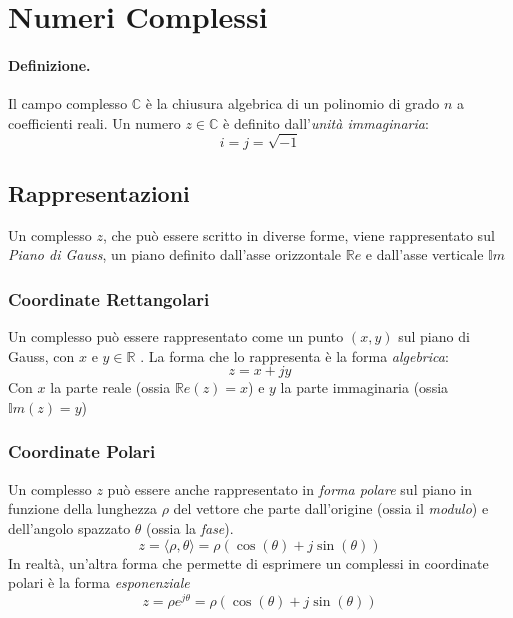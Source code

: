 \section{Numeri Complessi}
\paragraph{Definizione.} Il campo complesso $\mathbb{C}$ è la chiusura algebrica di un polinomio di grado $n$ a coefficienti reali.
Un numero $z \in \mathbb{C}$ è definito dall'\textit{unità immaginaria}:
\begin{equation}
    i = j = \sqrt{-1}
\end{equation}

\subsection{Rappresentazioni}
Un complesso $z$, che può essere scritto in diverse forme, viene rappresentato sul \textit{Piano di Gauss}, 
un piano definito dall'asse orizzontale $\mathbb{R}e$ e dall'asse verticale $\mathbb{I}m$
\subsubsection{Coordinate Rettangolari}
Un complesso può essere rappresentato come un punto $\left(x,y\right)$ sul piano di Gauss, con $x$ e $y \in \mathbb{R}$ . La forma che lo rappresenta è la forma \textit{algebrica}:
\begin{equation}
    z = x + jy
\end{equation}
Con $x$ la parte reale (ossia $\mathbb{R}e(z) = x$) e $y$ la parte immaginaria (ossia $\mathbb{I}m(z) = y$)

\subsubsection{Coordinate Polari}
Un complesso $z$ può essere anche rappresentato in \textit{forma polare} sul piano in funzione della lunghezza $\rho$ del vettore che parte dall'origine (ossia il \textit{modulo}) e dell'angolo spazzato $\theta$ (ossia la \textit{fase}).
\begin{equation}
    z = \langle \rho, \theta \rangle = \rho\left(\cos\left(\theta\right) + j\sin\left(\theta\right) \right)
\end{equation}
In realtà, un'altra forma che permette di esprimere un complessi in coordinate polari è la forma \textit{esponenziale}
\begin{equation}
    z = \rho e^{j\theta} = \rho\left(\cos\left(\theta\right) + j\sin\left(\theta\right) \right) 
\end{equation} 


